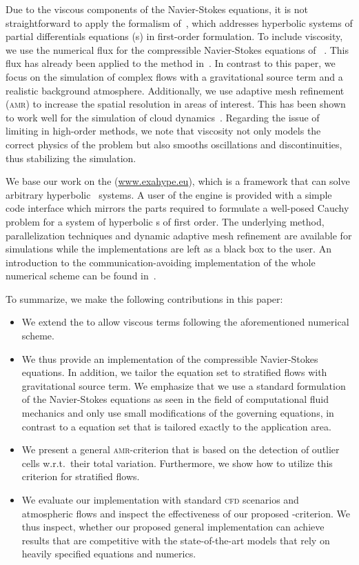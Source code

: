 \documentclass[runningheads]{llncs}
\begin{document}
Due to the viscous components of the Navier-Stokes equations, it is not straightforward to apply the \aderdg{} formalism of~\cite{dumbser2008unified}, which addresses hyperbolic systems of partial differentials equations (\pde{}s) in first-order formulation.
To include viscosity, we use the numerical flux for the compressible Navier-Stokes equations of \citeauthor{gassner2008discontinuous}~\cite{gassner2008discontinuous}.
This flux has already been applied to the \aderdg{} method in~\cite{dumbser2010arbitrary}.
In contrast to this paper, we focus on the simulation of complex flows with a gravitational source term and a realistic background atmosphere.
Additionally, we use adaptive mesh refinement (\textsc{amr}) to increase the spatial resolution in areas of interest.
This has been shown to work well for the simulation of cloud dynamics~\cite{muller2010adaptive}.
Regarding the issue of limiting in high-order \dg{} methods, we note that viscosity not only models the correct physics of the problem but also smooths oscillations and discontinuities, thus stabilizing the simulation.

We base our work on the \exahypeengine{} (\url{www.exahype.eu}), which is a framework that can solve arbitrary hyperbolic \pde\ systems.
A user of the engine is provided with a simple code interface which mirrors the parts required to formulate a well-posed Cauchy problem for a system of hyperbolic \pde{}s of first order.
The underlying \aderdg{} method, parallelization techniques and dynamic adaptive mesh refinement are available for simulations while the implementations are left as a black box to the user.
An introduction to the communication-avoiding implementation of the whole numerical scheme can be found in~\cite{charrier2018stop}.

To summarize, we make the following contributions in this paper:%
\begin{itemize}%
\item We extend the \exahypeengine{} to allow viscous terms following the aforementioned numerical scheme.
\item We thus provide an implementation of the compressible Navier-Stokes equations.
  In addition, we tailor the equation set to stratified flows with gravitational source term.
  We emphasize that we use a standard formulation of the Navier-Stokes equations as seen in the field of computational fluid mechanics and only use small modifications of the governing equations, in contrast to a equation set that is tailored exactly to the application area.
\item We present a general \textsc{amr}-criterion that is based on the detection of outlier cells w.r.t.\ their total variation.
  Furthermore, we show how to utilize this criterion for stratified flows.
\item We evaluate our implementation with standard \textsc{cfd} scenarios and atmospheric flows and inspect the effectiveness of our proposed \amr{}-criterion.
  We thus inspect, whether our proposed general implementation can achieve results that are competitive with the state-of-the-art models that rely on heavily specified equations and numerics.
\end{itemize}
%
\end{document}
